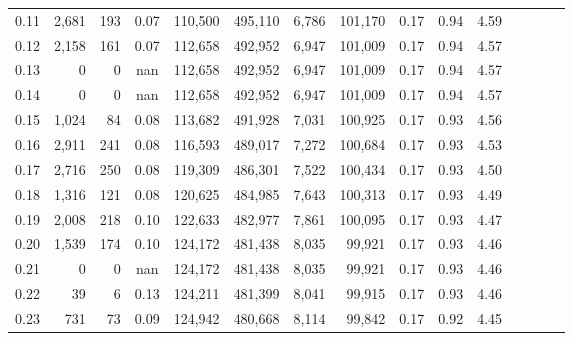 \begin{tabular}{rrrcrrrrrrrrrrr}
0.11 &   2,681 &    193 &                                       0.07 &  110,500 &  495,110 &    6,786 &  101,170 &  0.17 &  0.94 &                         4.59 \\
0.12 &   2,158 &    161 &                                       0.07 &  112,658 &  492,952 &    6,947 &  101,009 &  0.17 &  0.94 &                         4.57 \\
0.13 &       0 &      0 &                                        nan &  112,658 &  492,952 &    6,947 &  101,009 &  0.17 &  0.94 &                         4.57 \\
0.14 &       0 &      0 &                                        nan &  112,658 &  492,952 &    6,947 &  101,009 &  0.17 &  0.94 &                         4.57 \\
0.15 &   1,024 &     84 &                                       0.08 &  113,682 &  491,928 &    7,031 &  100,925 &  0.17 &  0.93 &                         4.56 \\
0.16 &   2,911 &    241 &                                       0.08 &  116,593 &  489,017 &    7,272 &  100,684 &  0.17 &  0.93 &                         4.53 \\
0.17 &   2,716 &    250 &                                       0.08 &  119,309 &  486,301 &    7,522 &  100,434 &  0.17 &  0.93 &                         4.50 \\
0.18 &   1,316 &    121 &                                       0.08 &  120,625 &  484,985 &    7,643 &  100,313 &  0.17 &  0.93 &                         4.49 \\
0.19 &   2,008 &    218 &                                       0.10 &  122,633 &  482,977 &    7,861 &  100,095 &  0.17 &  0.93 &                         4.47 \\
0.20 &   1,539 &    174 &                                       0.10 &  124,172 &  481,438 &    8,035 &   99,921 &  0.17 &  0.93 &                         4.46 \\
0.21 &       0 &      0 &                                        nan &  124,172 &  481,438 &    8,035 &   99,921 &  0.17 &  0.93 &                         4.46 \\
0.22 &      39 &      6 &                                       0.13 &  124,211 &  481,399 &    8,041 &   99,915 &  0.17 &  0.93 &                         4.46 \\
0.23 &     731 &     73 &                                       0.09 &  124,942 &  480,668 &    8,114 &   99,842 &  0.17 &  0.92 &                         4.45 \\

\end{tabular}
